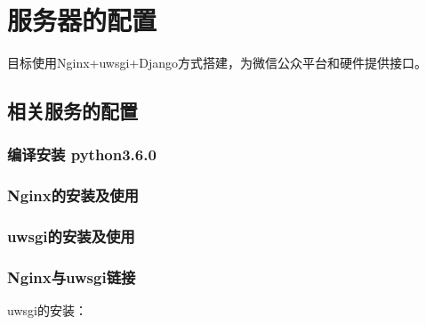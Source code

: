 \documentclass[cyan]{elegantnote}
\author{狼剩子}
\begin{document}
\maketitle
\tableofcontents
\chapter{服务器的配置}
目标使用Nginx+uwsgi+Django方式搭建，为微信公众平台和硬件提供接口。
\section{相关服务的配置}
\subsection{编译安装 python3.6.0}
\subsection{Nginx的安装及使用}
\subsection{uwsgi的安装及使用}
\subsection{Nginx与uwsgi链接}
uwsgi的安装：
\end{document}

